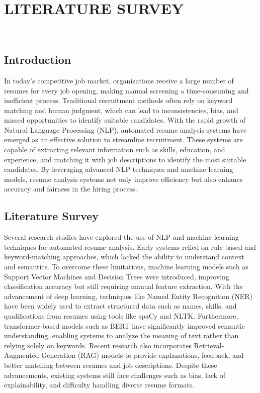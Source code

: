 \chapter{LITERATURE SURVEY}
\patchcmd{\chapter}{\thispagestyle{fancy}}{}{}
  \hrulefill\\
  \thispagestyle{empty}
\renewcommand{\thesection}{\thechapter.\arabic{section}}
  \doublespacing
  \section{Introduction}
 {%
  In today’s competitive job market, organizations receive a large number of resumes for every job opening, making manual screening a time-consuming and inefficient process. Traditional recruitment methods often rely on keyword matching and human judgment, which can lead to inconsistencies, bias, and missed opportunities to identify suitable candidates. With the rapid growth of Natural Language Processing (NLP), automated resume analysis systems have emerged as an effective solution to streamline recruitment. These systems are capable of extracting relevant information such as skills, education, and experience, and matching it with job descriptions to identify the most suitable candidates. By leveraging advanced NLP techniques and machine learning models, resume analysis systems not only improve efficiency but also enhance accuracy and fairness in the hiring process.}

\section{Literature Survey}
{%
Several research studies have explored the use of NLP and machine learning techniques for automated resume analysis. Early systems relied on rule-based and keyword-matching approaches, which lacked the ability to understand context and semantics. To overcome these limitations, machine learning models such as Support Vector Machines and Decision Trees were introduced, improving classification accuracy but still requiring manual feature extraction. With the advancement of deep learning, techniques like Named Entity Recognition (NER) have been widely used to extract structured data such as names, skills, and qualifications from resumes using tools like spaCy and NLTK. Furthermore, transformer-based models such as BERT have significantly improved semantic understanding, enabling systems to analyze the meaning of text rather than relying solely on keywords. Recent research also incorporates Retrieval-Augmented Generation (RAG) models to provide explanations, feedback, and better matching between resumes and job descriptions. Despite these advancements, existing systems still face challenges such as bias, lack of explainability, and difficulty handling diverse resume formats.}

